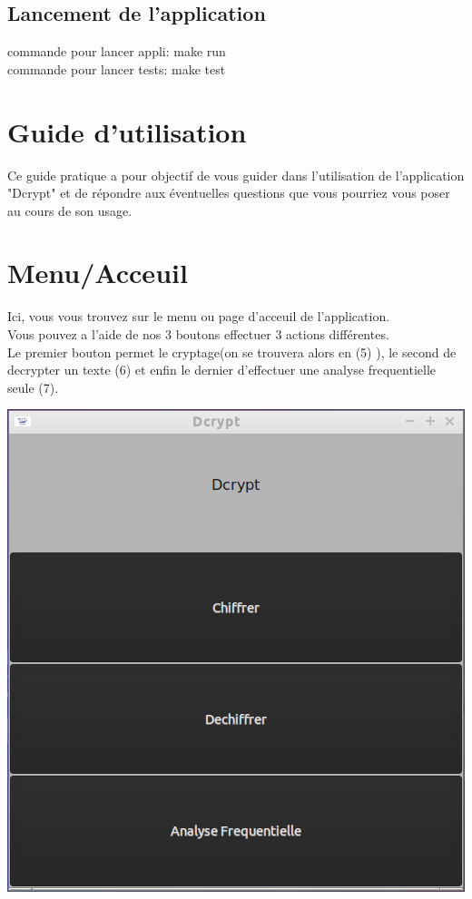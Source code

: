 \documentclass[a4]{article}
\begin{document}
		\subsection{Lancement de l'application}
			commande pour lancer appli: make run \\
			commande pour lancer tests: make test\\


	\section{Guide d'utilisation}
	
	
	Ce guide pratique a pour objectif de vous guider dans l’utilisation de l’application
"Dcrypt" et de répondre aux éventuelles questions que vous pourriez vous poser au
cours de son usage. 
	
	

	\section{Menu/Acceuil}
			Ici, vous vous trouvez sur le menu ou page d'acceuil de l'application. \\
			Vous pouvez a l'aide de nos 3 boutons effectuer 3 actions différentes.\\
 			Le premier bouton permet le cryptage(on se trouvera alors en (5) ), le second de 
 			decrypter un texte (6) et enfin le dernier d'effectuer une analyse frequentielle seule (7).
			\begin{center}\includegraphics[scale=0.4]{1.png}\end{center}
			
\end{document}
